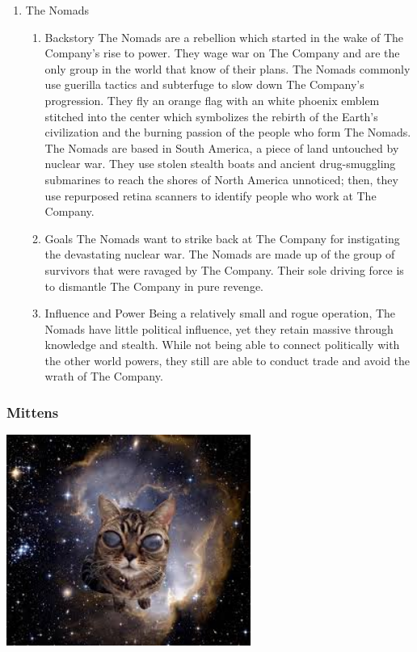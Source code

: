 \documentclass[12pt]{article}
\begin{document}
\begin{enumerate}
\item The Nomads
\label{sec:orgd6fa49d}

\begin{enumerate}
\item Backstory
\label{sec:org0def5a9}
The Nomads are a rebellion which started in the wake of The Company's rise to power. They wage war on The Company and are the only group in the world that know of their plans. The Nomads commonly use guerilla tactics and subterfuge to slow down The Company's progression. They fly an orange flag with an white phoenix emblem stitched into the center which symbolizes the rebirth of the Earth's civilization and the burning passion of the people who form The Nomads. The Nomads are based in South America, a piece of land untouched by nuclear war. They use stolen stealth boats and ancient drug-smuggling submarines to reach the shores of North America unnoticed; then, they use repurposed retina scanners to identify people who work at The Company.

\item Goals
\label{sec:org726b9e0}
The Nomads want to strike back at The Company for instigating the devastating nuclear war. The Nomads are made up of the group of survivors that were ravaged by The Company. Their sole driving force is to dismantle The Company in pure revenge.

\item Influence and Power
\label{sec:org0433446}
Being a relatively small and rogue operation, The Nomads have little political influence, yet they retain massive through knowledge and stealth. While not being able to connect politically with the other world powers, they still are able to conduct trade and avoid the wrath of The Company.
\end{enumerate}
\end{enumerate}

\subsubsection{Mittens}
\label{sec:orgafc36a2}
\begin{center}
\includegraphics[width=8cm]{./img/mittens.png}
\end{center}
\end{document}
